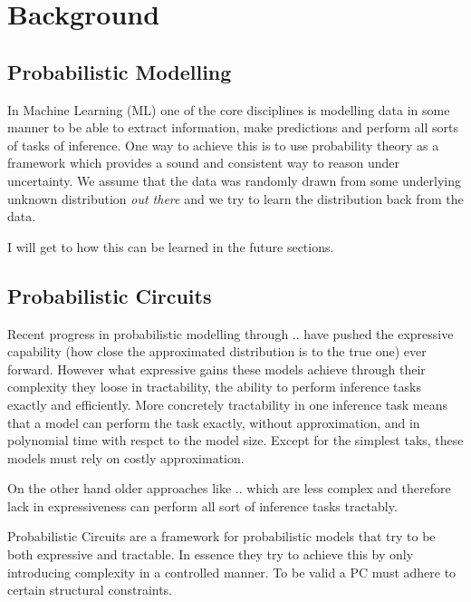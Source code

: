 \renewcommand{\vec}[1]{\textbf{#1}}
\newcommand{\norm}[1]{\left\lVert#1\right\rVert}


\chapter{Background}
\label{cha:background}

\section{Probabilistic Modelling}
\label{sec:pm}

In Machine Learning (ML) one of the core disciplines is modelling data in some manner to be able to 
extract information, make predictions and perform all sorts of tasks of inference. 
One way to achieve this is to use probability theory as a framework which provides a sound and consistent way to
reason under uncertainty. We assume that the data was randomly drawn from some underlying unknown distribution
\emph{out there} and we try to learn the distribution back from the data. \cite{pc_intro}

I will get to how this can be learned in the future sections.




\section{Probabilistic Circuits}
\label{sec:pc}

Recent progress in probabilistic modelling through .. have pushed the expressive capability (how close the 
approximated distribution is to the true one) ever forward. However what expressive gains these models achieve through 
their complexity they loose in tractability, the ability to perform inference tasks exactly and efficiently.
More concretely tractability in one inference task means that a model can perform the task exactly, without approximation, and in polynomial time with respct to the model size.
Except for the simplest taks, these models must rely on costly approximation.

On the other hand older approaches like .. which are less complex and therefore lack in expressiveness can perform 
all sort of inference tasks tractably.

Probabilistic Circuits are a framework for probabilistic models that try to be both expressive and tractable. 
In essence they try to achieve this by only introducing complexity in a controlled manner. To be valid a PC must 
adhere to certain structural constraints. 

